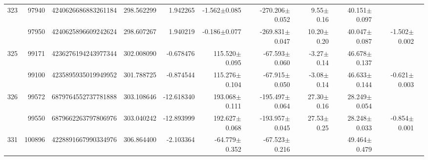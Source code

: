 \documentclass{ws-ijmpd}
\begin{document}
\begin{landscape}
\begin{longtable}{rrrrrrrrrrl}
 \hline 323 &   97940 &      4240626686883261184 &                   298.562299 &                     1.942265 &                 -1.562$\pm$0.085 &               -270.206$\pm$0.052 &           9.55$\pm$  0.16 &        40.151$\pm$0.097 &                                           &                                                    \\
            &   97950 &      4240625896609242624 &                   298.607267 &                     1.940219 &                 -0.186$\pm$0.077 &               -269.831$\pm$0.047 &          10.20$\pm$  0.20 &        40.047$\pm$0.087 &                          -1.502$\pm$0.002 &                                                    \\
 \hline 325 &   99171 &      4236276194243977344 &                   302.008090 &                    -0.678476 &                115.520$\pm$0.095 &                -67.593$\pm$0.060 &          -3.27$\pm$  0.14 &        46.678$\pm$0.137 &                                           &                                                    \\
            &   99100 &      4235895935019949952 &                   301.788725 &                    -0.874544 &                115.276$\pm$0.104 &                -67.915$\pm$0.050 &          -3.08$\pm$  0.14 &        46.633$\pm$0.144 &                          -0.621$\pm$0.003 &                                                    \\
 \hline 326 &   99572 &      6879764552737781888 &                   303.108646 &                   -12.618340 &                193.068$\pm$0.111 &               -195.497$\pm$0.064 &          27.30$\pm$  0.16 &        28.249$\pm$0.054 &                                           &                                                    \\
            &   99550 &      6879662263797806976 &                   303.040242 &                   -12.893999 &                192.627$\pm$0.068 &               -193.957$\pm$0.045 &          27.53$\pm$  0.25 &        28.248$\pm$0.033 &                          -0.854$\pm$0.001 &                                                    \\
 \hline 331 &  100896 &      4228891667990334976 &                   306.864400 &                    -2.103364 &                -64.779$\pm$0.352 &                -67.523$\pm$0.216 &                           &        49.464$\pm$0.479 &                                           &                                                    \\

\end{longtable}
\end{landscape}
\end{document}
